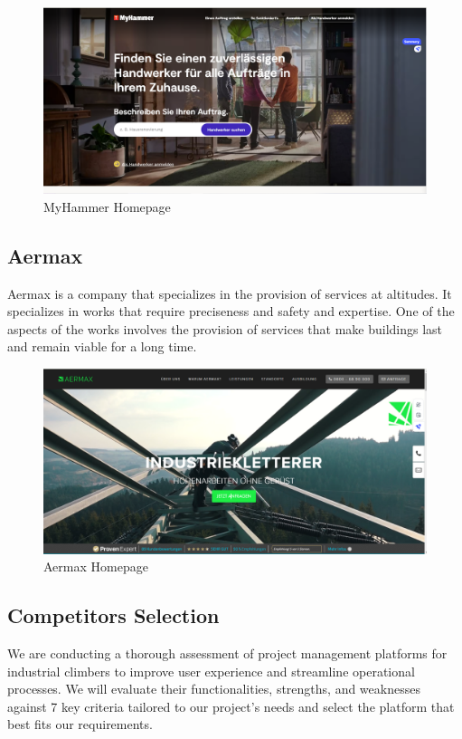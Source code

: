 \begin{figure}[H]
    \centering
    \includegraphics[width=\linewidth]{src/assets/chapters/myHammer.PNG}
    \caption{MyHammer Homepage}
    \label{fig:myhammer_image}
\end{figure}



\subsection{Aermax}
Aermax is a company that specializes in the provision of services at altitudes. It specializes in works that require preciseness and safety and expertise. One of the aspects of the works involves the provision of services that make buildings last and remain viable for a long time. 


\begin{figure}[H]
    \centering
    \includegraphics[width=\linewidth]{src/assets/images/aermax.PNG}
    \caption{Aermax Homepage}
    \label{fig:aermax_image}
\end{figure}

\subsection{Competitors Selection}
We are conducting a thorough assessment of project management platforms for industrial climbers to improve user experience and streamline operational processes. We will evaluate their functionalities, strengths, and weaknesses against 7 key criteria tailored to our project's needs and select the platform that best fits our requirements.

